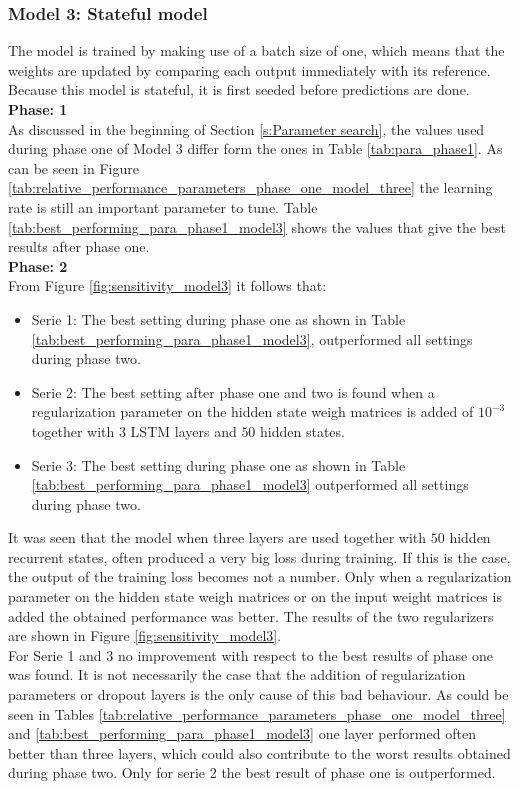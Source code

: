 \subsubsection{Model 3: Stateful model}
The model is trained by making use of a batch size of one, which means that the weights are updated by comparing each output immediately with its reference. Because this model is stateful, it is first seeded before predictions are done.\\

\textbf{Phase: 1}\\
As discussed in the beginning of Section \ref{s:Parameter search}, the values used during phase one of Model 3 differ form the ones in Table \ref{tab:para_phase1}. As can be seen in Figure \ref{tab:relative_performance_parameters_phase_one_model_three} the learning rate is still an important parameter to tune. Table \ref{tab:best_performing_para_phase1_model3} shows the values that give the best results after phase one.\\ 

\textbf{Phase: 2}\\
From Figure \ref{fig:sensitivity_model3} it follows that:
\begin{itemize}
	\item Serie 1: The best setting during phase one as shown in Table \ref{tab:best_performing_para_phase1_model3}, outperformed all settings during phase two. 
	\item Serie 2: The best setting after phase one and two is found when a regularization parameter on the hidden state weigh matrices is added of $ 10^{-3} $ together with $ 3 $ LSTM layers and $ 50 $ hidden states.
	\item Serie 3: The best setting during phase one as shown in Table \ref{tab:best_performing_para_phase1_model3} outperformed all settings during phase two. 
\end{itemize}

It was seen that the model when three layers are used together with $ 50 $ hidden recurrent states, often produced a very big loss during training. If this is the case, the output of the training loss becomes not a number. Only when a regularization parameter on the hidden state weigh matrices or on the input weight matrices is added the obtained performance was better. The results of the two regularizers are shown in Figure \ref{fig:sensitivity_model3}.\\

For Serie 1 and 3 no improvement with respect to the best results of phase one was found. It is not necessarily the case that the addition of regularization parameters or dropout layers is the only cause of this bad behaviour. As could be seen in Tables \ref{tab:relative_performance_parameters_phase_one_model_three} and \ref{tab:best_performing_para_phase1_model3} one layer performed often better than three layers, which could also contribute to the worst results obtained during phase two. Only for serie 2 the best result of phase one is outperformed. \\

